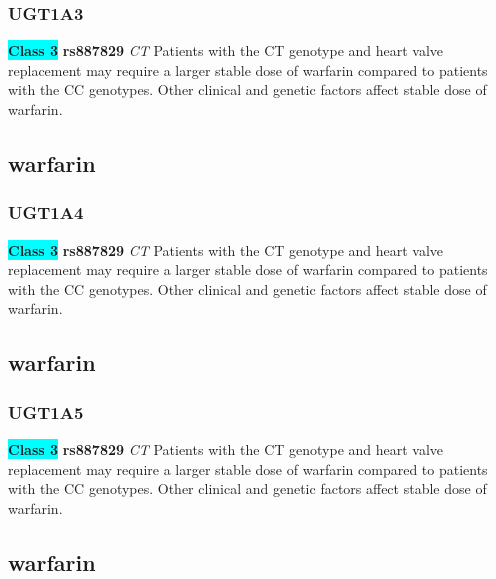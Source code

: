 \documentclass{book}
\begin{document}
\subsubsection{ UGT1A3 }

\begin{center}
\textbf{\colorbox{cyan} {Class 3}} \textbf{ rs887829 } \textit{ CT }
Patients with the CT genotype and heart valve replacement may require a larger stable dose of warfarin compared to patients with the CC genotypes. Other clinical and genetic factors affect stable dose of warfarin.


\end{center}\subsection{ warfarin }


\subsubsection{ UGT1A4 }

\begin{center}
\textbf{\colorbox{cyan} {Class 3}} \textbf{ rs887829 } \textit{ CT }
Patients with the CT genotype and heart valve replacement may require a larger stable dose of warfarin compared to patients with the CC genotypes. Other clinical and genetic factors affect stable dose of warfarin.


\end{center}\subsection{ warfarin }


\subsubsection{ UGT1A5 }

\begin{center}
\textbf{\colorbox{cyan} {Class 3}} \textbf{ rs887829 } \textit{ CT }
Patients with the CT genotype and heart valve replacement may require a larger stable dose of warfarin compared to patients with the CC genotypes. Other clinical and genetic factors affect stable dose of warfarin.


\end{center}\subsection{ warfarin }
\end{document}
